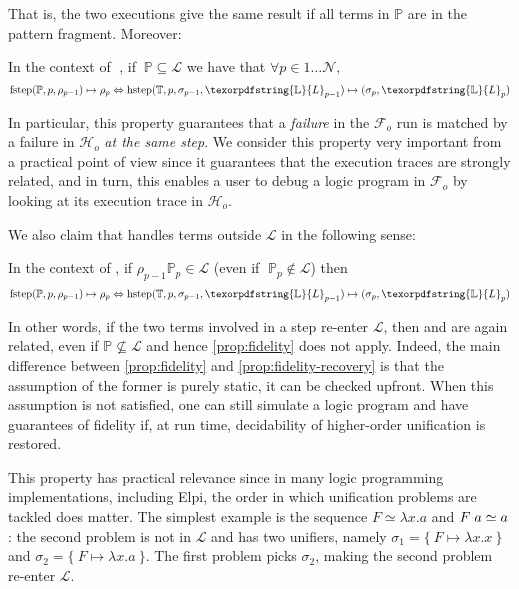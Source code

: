 \documentclass[sigconf,natbib=false,review]{acmart}
\newcommand{\appsep}{\ensuremath{\textcolor{lightgray}{\cdot}}}
\newcommand{\UnifRel}{\ensuremath{\simeq}}
\newcommand{\llambda}{\ensuremath{\mathcal{L}}\xspace}
\newcommand{\Fo}{\texorpdfstring{\ensuremath{\mathcal{F}_{\!o}\xspace}}{Fo}} %
\newcommand{\Ho}{\texorpdfstring{\ensuremath{\mathcal{H}_o}\xspace}{Ho}}
\newcommand{\linkStore}{\texorpdfstring{\ensuremath{\mathbb{L}}\xspace}{L}}
\newcommand{\foUnifPb}{\ensuremath{\mathbb{P}}\xspace}
\newcommand{\hoUnifPb}{\ensuremath{\mathbb{T}}\xspace}
\begin{document}
\noindent
That is, the two executions give the same result if all terms in
\foUnifPb are in the pattern fragment. Moreover:

\begin{proposition}\label{prop:fidelity}
In the context of$\;$ \hrun, if $~\foUnifPb \subseteq \llambda$ we have that
$\forall p \in 1 \ldots \mathcal{N},$
$$
\stepF{\foUnifPb}{p}{\rho_{p-1}}{\rho_p}
\Leftrightarrow
\stepH{\hoUnifPb}{p}{\sigma_{p-1}}{\linkStore_{p-1}}{\sigma_p}{\linkStore_p}
$$
\end{proposition}
\noindent
In particular, this property guarantees that a \emph{failure} in the \Fo{} run
is matched by a failure in \Ho{} \emph{at the same step}. We consider this
property very important from a practical point of view since it guarantees
that the execution traces are strongly related, and in turn, this enables a user
to debug a logic program in \Fo{} by looking at its execution trace in
\Ho{}.

We also claim that \hrun handles terms outside \llambda in the following sense:

\begin{proposition}\label{prop:fidelity-recovery} 
In the context of \hrun, if 
$\rho_{p-1} \foUnifPb_{p} \in \llambda$ 
(even if $\;\foUnifPb_{p} \not\in \llambda$)
then
$$
\stepF{\foUnifPb}{p}{\rho_{p-1}}{\rho_p} \Leftrightarrow
\stepH{\hoUnifPb}{p}{\sigma_{p-1}}{\linkStore_{p-1}}{\sigma_{p}}{\linkStore_p}
$$
\end{proposition}
  
In other words, if the two terms involved in a step
re-enter \llambda, then \hstep and \fstep are again related, even if
$\foUnifPb \not\subseteq \llambda$ and hence \cref{prop:fidelity} does not apply.
Indeed, the main difference between \cref{prop:fidelity} and \cref{prop:fidelity-recovery}
is that the assumption of the former is purely static, it can be checked upfront. 
When this assumption is not satisfied, one can still simulate a logic program and
have guarantees of fidelity if, at run time, decidability of higher-order
unification is restored.

This property has practical relevance since in many logic programming
implementations, including Elpi, the order in which unification problems
are tackled does matter.
The simplest example is the sequence $F \UnifRel \lambda x.a$ and
$F \appsep a \UnifRel a$: the second problem is not in \llambda and has two
unifiers, namely $\sigma_1 = \{~ F \mapsto \lambda x.x ~\}$ and
$\sigma_2 = \{~ F \mapsto \lambda x.a ~\}$. The first problem picks $\sigma_2$,
making the second problem re-enter \llambda.
\end{document}
